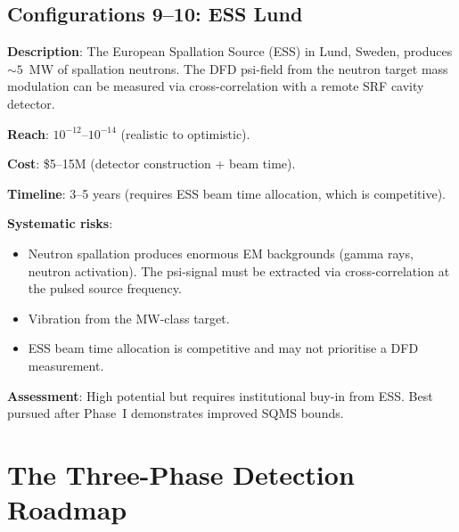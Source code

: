 \documentclass[11pt]{article}
\theoremstyle{definition}
\theoremstyle{remark}
\begin{document}
\subsection{Configurations 9--10: ESS Lund}

\textbf{Description}: The European Spallation Source (ESS) in Lund,
Sweden, produces $\sim 5$~MW of spallation neutrons. The DFD psi-field
from the neutron target mass modulation can be measured via
cross-correlation with a remote SRF cavity detector.

\textbf{Reach}: $10^{-12}$--$10^{-14}$ (realistic to optimistic).

\textbf{Cost}: \$5--15M (detector construction + beam time).

\textbf{Timeline}: 3--5 years (requires ESS beam time allocation,
which is competitive).

\textbf{Systematic risks}:
\begin{itemize}[nosep]
\item Neutron spallation produces enormous EM backgrounds (gamma rays,
  neutron activation). The psi-signal must be extracted via
  cross-correlation at the pulsed source frequency.
\item Vibration from the MW-class target.
\item ESS beam time allocation is competitive and may not prioritise
  a DFD measurement.
\end{itemize}

\textbf{Assessment}: High potential but requires institutional buy-in
from ESS. Best pursued after Phase~I demonstrates improved SQMS bounds.

\section{The Three-Phase Detection Roadmap}
\label{sec:roadmap}
\end{document}
